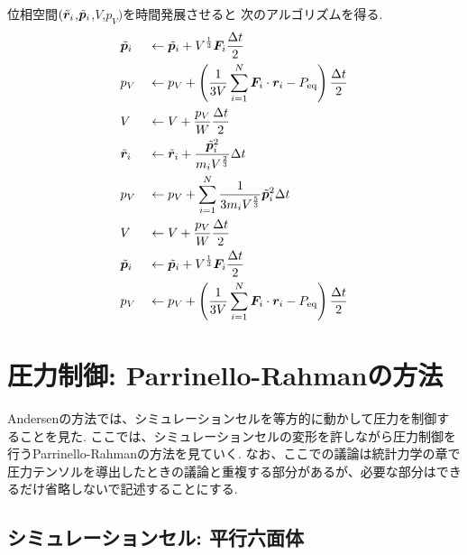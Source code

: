  位相空間$(\Tilde{\bm{r}}_{i}$,$\Tilde{\bm{p}}_{i}$,$V$,$p_{V})$を時間発展させると
 次のアルゴリズムを得る. 
\begin{alignat}{2}
  &\Tilde{\bm{p}}_{i}
  &&\gets
  \Tilde{\bm{p}}_{i}
  +
  V^{\frac{1}{3}} \bm{F}_{i} \frac{\Delta t}{2}
  \label{eq:Andersen21.1}
  \\
  & p_{V}
  &&\gets
  p_{V}
  + \left(
          \frac{1}{3V} \sum_{i=1}^{N} \bm{F}_{i}
          \cdot \bm{r}_{i} - P_{\mathrm{eq}}
    \right)
    \frac{\Delta t}{2}
  \label{eq:Andersen21.2}
  \\
  &V
  &&\gets
  V + \frac{p_{V}}{W} \frac{\Delta t}{2}
  \label{eq:Andersen21.3}
  \\
  &\Tilde{\bm{r}}_{i}
  &&\gets
  \Tilde{\bm{r}}_{i}
  + \frac{\Tilde{\bm{p}}_{i}^{2}}{m_{i} V^{\frac{2}{3}}} \Delta t
  \label{eq:Andersen21.4}
   \\
  &p_{V}
  &&\gets
  p_{V}
  + \sum_{i=1}^{N}
    \frac{1}{3 m_{i} V^{\frac{5}{3}}}
    \Tilde{\bm{p}}_{i}^{2} \Delta t
  \label{eq:Andersen21.5}
  \\
  &V
  &&\gets
  V + \frac{p_{V}}{W} \frac{\Delta t}{2}
  \label{eq:Andersen21.6}
  \\
  &\Tilde{\bm{p}}_{i}
  &&\gets
  \Tilde{\bm{p}}_{i}
  + V^{\frac{1}{3}} \bm{F}_{i} \frac{\Delta t}{2}
  \label{eq:Andersen21.4}
  \\
   &p_{V}
   &&\gets p_{V}
   + \left(
            \frac{1}{3V} \sum_{i=1}^{N} \bm{F}_{i}
            \cdot \bm{r}_{i} - P_{\mathrm{eq}}
    \right)
    \frac{\Delta t}{2}
 \label{eq:Andersen21.5}
\end{alignat}

\clearpage

\section{圧力制御: Parrinello-Rahmanの方法}
Andersenの方法では、シミュレーションセルを等方的に動かして圧力を制御することを見た.
ここでは、シミュレーションセルの変形を許しながら圧力制御を行うParrinello-Rahman\cite{Parrinello1980, Nose1983}の方法を見ていく. なお、ここでの議論は統計力学の章で圧力テンソルを導出したときの議論と重複する部分があるが、必要な部分はできるだけ省略しないで記述することにする.

\subsection{シミュレーションセル: 平行六面体}
